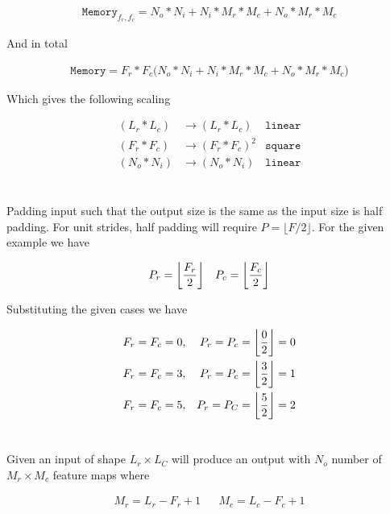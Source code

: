 \documentclass[12pt]{article}
\DeclarePairedDelimiter{\floor}{\lfloor}{\rfloor}
\begin{document}
\begin{align}
	\texttt{Memory}_{f_r, f_c} = N_o * N_i + N_i * M_r * M_c + N_o * M_r * M_c
\end{align}

And in total

\begin{align}
	\texttt{Memory} = F_r * F_c \bigg(N_o * N_i + N_i * M_r * M_c + N_o * M_r *
	M_c\bigg)
\end{align}

Which gives the following scaling

\begin{align}
	(L_r * L_c) &\rightarrow (L_r * L_c) &\texttt{linear}  \\
	(F_r * F_c) &\rightarrow (F_r * F_c)^2 &\texttt{square} \\
	(N_o * N_i) &\rightarrow (N_o * N_i) &\texttt{linear}
\end{align}

\section{}

Padding input such that the output size is the same as the input size is half
padding. For unit strides, half padding will require $P = \lfloor F / 2
\rfloor$. For the given example we have

\begin{align}
	P_r = \floor[\bigg]{\frac{F_r}{2}} && P_c = \floor[\bigg]{\frac{F_c}{2}}
\end{align}

Substituting the given cases we have

\begin{align}
	F_r=F_c=0, &&
	P_r = P_c = \floor[\bigg]{\frac{0}{2}} = 0 \\
	F_r=F_c=3, &&
	P_r = P_c =  \floor[\bigg]{\frac{3}{2}} = 1 \\
	F_r=F_c=5, &&
	P_r = P_C = \floor[\bigg]{\frac{5}{2}} = 2
\end{align}

\section{}

Given an input of shape $L_r \times L_C$ will produce an output with
$N_o$ number of $M_r \times M_c$ feature maps where

\begin{align}
	M_r = L_r - F_r + 1 && M_c = L_c - F_c + 1
\end{align}
\end{document}
